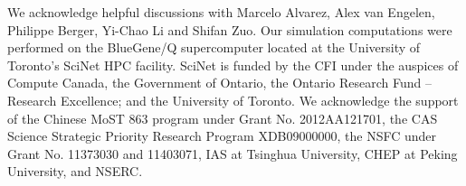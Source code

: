 \documentclass[aps,prl,twocolumn,showpacs,superscriptaddress,groupedaddress,nofootinbib]{revtex4}  %
\begin{document}
We acknowledge helpful discussions with Marcelo Alvarez, Alex van Engelen,
Philippe Berger, Yi-Chao Li and Shifan Zuo.
Our simulation computations were performed on the BlueGene/Q supercomputer 
located at the University of Toronto’s SciNet HPC facility.
SciNet is funded by the CFI under the auspices of Compute Canada, 
the Government of Ontario, the Ontario Research Fund – Research Excellence;
and the University of Toronto.
We acknowledge the support of the Chinese MoST 863 program under Grant 
No. 2012AA121701, the CAS Science Strategic Priority Research Program 
XDB09000000, the NSFC under Grant No. 11373030 and 11403071, IAS at 
Tsinghua University, CHEP at Peking University, and NSERC.



\end{document}
